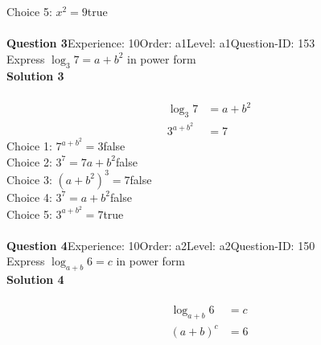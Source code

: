 \documentclass{article}
\begin{document}
Choice 5: \hspace{20pt}$x^2=9$\hspace{20pt}true\\
\\[4pt]
\noindent\textbf{Question 3}\hspace{20pt}Experience: 10\hspace{20pt}Order: a1\hspace{20pt}Level: a1\hspace{20pt}Question-ID: 153\\[2pt]
Express $\log_{3}7=a+b^2$ in power form\\[4pt]
\noindent\textbf{Solution 3}\\[2pt]
\\[-35pt]\begin{align*}
\log_{3}7&=a+b^2\\[2pt]
3^{a+b^2}&=7
\end{align*}
Choice 1: \hspace{20pt}$7^{a+b^2}=3$\hspace{20pt}false\\
Choice 2: \hspace{20pt}$3^7=7a+b^2$\hspace{20pt}false\\
Choice 3: \hspace{20pt}$(a+b^2)^3=7$\hspace{20pt}false\\
Choice 4: \hspace{20pt}$3^{7}=a+b^2$\hspace{20pt}false\\
Choice 5: \hspace{20pt}$3^{a+b^2}=7$\hspace{20pt}true\\
\\[4pt]
\noindent\textbf{Question 4}\hspace{20pt}Experience: 10\hspace{20pt}Order: a2\hspace{20pt}Level: a2\hspace{20pt}Question-ID: 150\\[2pt]
Express $\log_{a+b}6=c$ in power form\\[4pt]
\noindent\textbf{Solution 4}\\[2pt]
\\[-35pt]\begin{align*}
\log_{a+b}6&=c\\[2pt]
(a+b)^c&=6
\end{align*}
\end{document}
